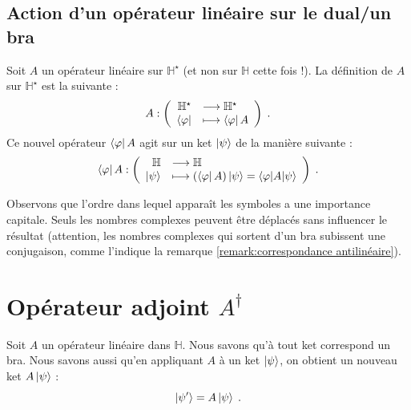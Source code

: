\documentclass[../notesdecours.tex]{subfiles}
\begin{document}

\subsection{Action d'un opérateur linéaire sur le dual/un bra}
Soit $A$ un opérateur linéaire sur $\mathbb{H}^\star$ (et non sur $\mathbb{H}$ cette fois !). La définition de $A$ sur $\mathbb{H}^\star$ est la suivante :
$$A : \left(\begin{array}{rl}
	\mathbb{H} ^\star &\longrightarrow \mathbb{H}^\star \\
	\bra \varphi &\longmapsto \bra \varphi A
\end{array}\right) \; .$$
Ce nouvel opérateur $\bra \varphi A$ agit sur un ket $\ket \psi$ de la manière suivante : 
$$\bra\varphi A : \left(\begin{array}{rl}
	\mathbb{H}  &\longrightarrow \mathbb{H}\\
	\ket \psi &\longmapsto (\bra \varphi A)\ket \psi = \braket{\varphi | A | \psi}
\end{array}\right) \; .$$


\begin{remark} Observons que l'ordre dans lequel apparaît les symboles a une importance capitale. Seuls les nombres complexes peuvent être déplacés sans influencer le résultat (attention, les nombres complexes qui sortent d'un bra subissent une conjugaison, comme l'indique la remarque \ref{remark:correspondance antilinéaire}). \end{remark}


\section{Opérateur adjoint $A^\dag$}
Soit $A$ un opérateur linéaire dans $\mathbb{H}$. Nous savons qu'à tout ket correspond un bra. Nous savons aussi qu'en appliquant $A$ à un ket $\ket \psi$, on obtient un nouveau ket $A\ket \psi$ : $$\ket{\psi'} = A \ket \psi \; .$$
\end{document}
